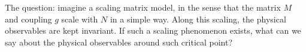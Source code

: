 
The question: imagine a scaling matrix model, in the sense that
the matrix $M$ and coupling $g$ scale with $N$ in a simple way.
Along this scaling, the physical observables are kept invariant.
If such a scaling phenomenon exists, what can we say about the
physical observables around such critical point?
